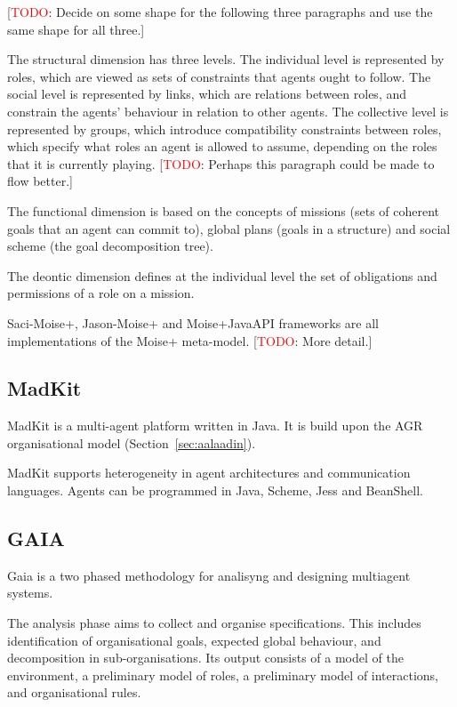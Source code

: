 \documentclass{article}
\newcommand{\todo}[1]{[\textcolor{red}{TODO}: #1]}
\begin{document}
\todo{Decide on some shape for the following three paragraphs and use the same
shape for all three.}

The structural dimension has three levels. The individual level is represented
by roles, which are viewed as sets of constraints that agents ought to follow.
The social level is represented by links, which are relations between roles,
and constrain the agents' behaviour in relation to other agents. The collective
level is represented by groups, which introduce compatibility constraints
between roles, which specify what roles an agent is allowed to assume,
depending on the roles that it is currently playing. \todo{Perhaps this
paragraph could be made to flow better.}

The functional dimension is based on the concepts of missions (sets of coherent
goals that an agent can commit to), global plans (goals in a structure) and
social scheme (the goal decomposition tree). 

The deontic dimension defines at the individual level the set of obligations
and permissions of a role on a mission.

Saci-Moise+, Jason-Moise+ and Moise+JavaAPI frameworks are all implementations
of the Moise+ meta-model. \todo{More detail.}

\subsection{MadKit} 

MadKit \cite{conf/agents/GutknechtF00a} is a multi-agent platform written in Java. It is build upon the AGR
organisational model (Section~\ref{sec:aalaadin}).

MadKit supports heterogeneity in agent architectures and communication
languages. Agents can be programmed in Java, Scheme, Jess and BeanShell.

\subsection{GAIA}

Gaia \cite{journals/aamas/WooldridgeJK00} is a two phased methodology for analisyng and designing multiagent
systems.

The analysis phase aims to collect and organise specifications. This includes
identification of organisational goals, expected global behaviour, and
decomposition in sub-organisations. Its output consists of a model of the
environment, a preliminary model of roles, a preliminary model of interactions,
and organisational rules.
\end{document}
